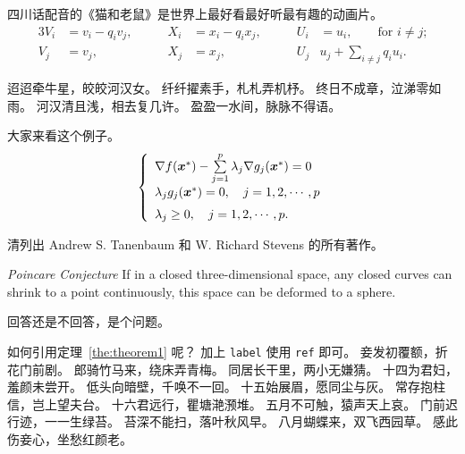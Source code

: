 \begin{corollary}
  四川话配音的《猫和老鼠》是世界上最好看最好听最有趣的动画片。
  \begin{alignat}{3}
    V_i & =v_i - q_i v_j, & \qquad X_i                   & = x_i - q_i x_j,
        & \qquad U_i      & = u_i,
    \qquad \text{for $i\ne j$;}\label{eq:B}                                 \\
    V_j & = v_j,          & \qquad X_j                   & = x_j,
        & \qquad U_j      & u_j + \sum_{i\ne j} q_i u_i.
  \end{alignat}
\end{corollary}

迢迢牵牛星，皎皎河汉女。
纤纤擢素手，札札弄机杼。
终日不成章，泣涕零如雨。
河汉清且浅，相去复几许。
盈盈一水间，脉脉不得语。

\begin{example}
  大家来看这个例子。
  \begin{equation}
    \label{ktc}
    \left\{\begin{array}{l}
      \nabla f({\mbox{\boldmath $x$}}^*)-\sum\limits_{j=1}^p\lambda_j\nabla g_j({\mbox{\boldmath $x$}}^*)=0 \\[0.3cm]
      \lambda_jg_j({\mbox{\boldmath $x$}}^*)=0,\quad j=1,2,\cdots,p                                         \\[0.2cm]
      \lambda_j\ge 0,\quad j=1,2,\cdots,p.
    \end{array}\right.
  \end{equation}
\end{example}

\begin{exercise}
  清列出 Andrew S. Tanenbaum 和 W. Richard Stevens 的所有著作。
\end{exercise}

\begin{conjecture} \textit{Poincare Conjecture}
  If in a closed three-dimensional space, any closed curves can shrink to a point continuously, this space can be
  deformed to a sphere.
\end{conjecture}

\begin{problem}
回答还是不回答，是个问题。
\end{problem}

如何引用定理~\ref{the:theorem1} 呢？
加上 \verb|label| 使用 \verb|ref| 即可。
妾发初覆额，折花门前剧。
郎骑竹马来，绕床弄青梅。
同居长干里，两小无嫌猜。
十四为君妇，羞颜未尝开。
低头向暗壁，千唤不一回。
十五始展眉，愿同尘与灰。
常存抱柱信，岂上望夫台。
十六君远行，瞿塘滟滪堆。
五月不可触，猿声天上哀。
门前迟行迹，一一生绿苔。
苔深不能扫，落叶秋风早。
八月蝴蝶来，双飞西园草。
感此伤妾心，坐愁红颜老。
